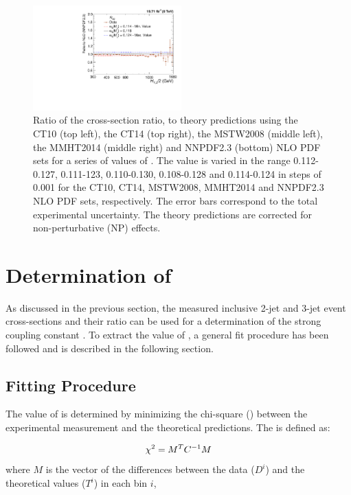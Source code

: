 \begin{figure}[!htbp]
\begin{center}
 \vspace*{3mm}
 \includegraphics[width=0.51\textwidth]{Plots_HT_2_150/Sensitivity_double_ratio_32_NNPDF23.pdf}
 \caption{Ratio of the cross-section ratio, \ratio to theory predictions using the CT10 (top left), the CT14 (top right), the MSTW2008 (middle left), the MMHT2014 (middle right) and NNPDF2.3 (bottom) NLO PDF sets for a series of values of \alpsmz. The \alpsmz value is varied in the range 0.112-0.127, 0.111-123, 0.110-0.130, 0.108-0.128 and 0.114-0.124 in steps of 0.001 for the CT10, CT14, MSTW2008, MMHT2014 and NNPDF2.3 NLO PDF sets, respectively. The error bars correspond to the total experimental uncertainty. The theory predictions are corrected for non-perturbative (NP) effects.}
 \label{fig:sensitivity_double_ratio}
 \end{center}
\end{figure}

\section{Determination of \texorpdfstring{\alpsmz}{alpha-S(M(Z))}}

As discussed in the previous section, the measured inclusive 2-jet and 3-jet event cross-sections and their ratio \ratio can be used for a determination of the strong coupling constant \alpsmz. To extract the value of \alpsmz, a general fit procedure \cite{Chatrchyan:2013txa,Khachatryan:2014waa,Khachatryan:2016mlc} has been followed and is described in the following section. 

\subsection{Fitting Procedure}
\label{sec:Fits_procedure}
The value of \alpsmz is determined by minimizing the chi-square (\chisq) between the experimental measurement and the theoretical predictions. The \chisq is defined as:

\begin{equation}
  \label{chisq}
  \chi^2 = M^{T}C^{-1}M
\end{equation}
where $M$ is the vector of the differences between the data ($D^{i}$) and the theoretical values ($T^{i}$) in each bin $i$,

